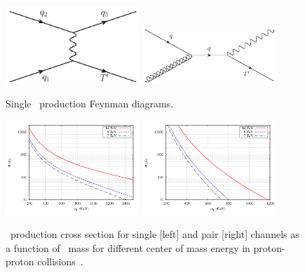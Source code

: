 \begin{figure}[!Hhtbp]
  \begin{center}
    \includegraphics[width=0.45\textwidth]{figs/Tchannel_T_single.jpg}
    \includegraphics[width=0.45\textwidth]{figs/QuarkGluonFusion_SingleT.jpg}
    \caption{Single \Tp~production Feynman diagrams.}
    \label{fig:ProdDiagSingle}
  \end{center}
\end{figure}

\begin{figure}[!Hhtbp]
  \begin{center}
    \includegraphics[width=0.45\textwidth]{figs/pheno_prod_single_tp.png}
    \includegraphics[width=0.45\textwidth]{figs/pheno_prod_pair_tp.png}
    \caption{\Tp~production cross section for single [left] and pair [right] channels as a function of \Tp~mass for different center of mass energy in proton-proton collisions~\cite{Cacciapaglia:2011fx}.}
    \label{fig:TProdXS}
  \end{center}
\end{figure}

